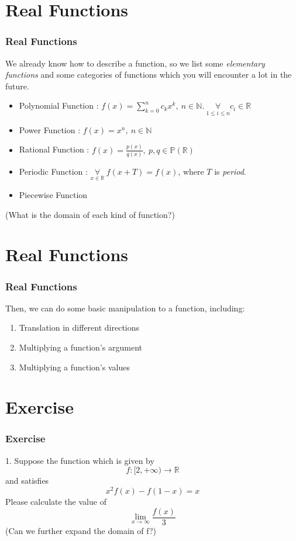 \documentclass[12pt, t]{beamer}
\renewcommand{\emph}[1]{{\color{Turquoise3}\textsl{#1}}}
\begin{document}
\section{Real Functions}
\begin{frame}
    \frametitle{Real Functions}
We already know how to describe a function, so we list some \emph{elementary functions} and some categories of functions 
which you will encounter a lot in the future.
\begin{itemize}
    \item Polynomial Function : $f(x)=\sum^n_{k=0}c_kx^k,\ n\in \mathbb{N}.\ \underset{1\leq i\leq n}{\forall}c_i\in \mathbb{R}$
    \item Power Function : $f(x)=x^n,\ n\in \mathbb{N}$
    \item Rational Function : $f(x)=\frac{p(x)}{q(x)},\ p,q\in \mathbb{P}(\mathbb{R})$
    \item Periodic Function : $\underset{x\in \mathbb{R}}{\forall}\ f(x+T)=f(x)$, where $T$ is \emph{period}.
    \item Piecewise Function
\end{itemize}
(What is the domain of each kind of function?)
\end{frame}

\section{Real Functions}
\begin{frame}
    \frametitle{Real Functions}
Then, we can do some basic manipulation to a function, including:
\begin{enumerate}
    \item Translation in different directions
    \item Multiplying a function's argument
    \item Multiplying a function's values
\end{enumerate}
\end{frame}

\section{Exercise}
\begin{frame}
    \frametitle{Exercise}
1. Suppose the function which is given by
\begin{equation*}
    f:[2,+\infty)\rightarrow \mathbb{R}
\end{equation*}
and satisfies 
\begin{equation*}
    x^2f(x)-f(1-x)=x
\end{equation*}
Please calculate the value of 
\begin{equation*}
    \lim_{x\rightarrow \infty}\frac{f(x)}{3}
\end{equation*}
(Can we further expand the domain of f?)
\end{frame}
\end{document}
